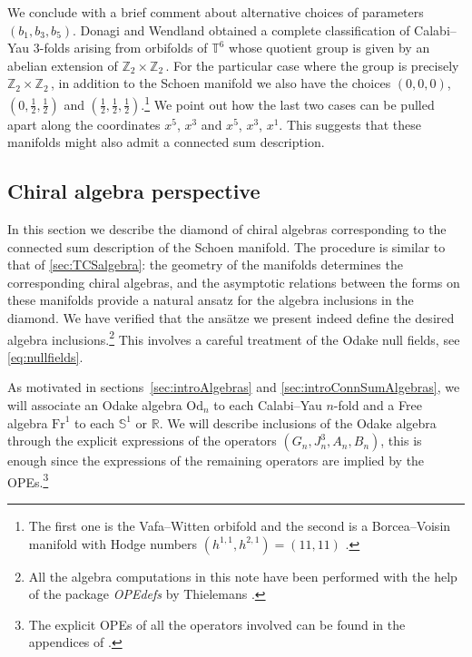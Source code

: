 \documentclass{pspum-l}
\newcommand*\Sc{\mathbb{S}}
\newcommand*\R{\mathbb{R}}
\theoremstyle{definition}
\theoremstyle{remark}
\numberwithin{equation}{section}
\begin{document}
We conclude with a brief comment about alternative choices of parameters $(b_1,b_3,b_5)$. Donagi and Wendland \cite{Donagi:2008xy} obtained a complete classification of Calabi--Yau 3-folds arising from orbifolds of $\mathbb{T}^6$ whose quotient group is given by an abelian extension of $\mathbb{Z}_2\times\mathbb{Z}_2\,$. For the particular case where the group is precisely $\mathbb{Z}_2\times\mathbb{Z}_2\,$, in addition to the Schoen manifold we also have the choices $(0,0,0)$, $(0,\frac{1}{2},\frac{1}{2})$ and $(\frac{1}{2},\frac{1}{2},\frac{1}{2})$.\footnote{The first one is the Vafa--Witten orbifold \cite{Vafa:1994rv} and the second is a Borcea--Voisin manifold \cite{Borcea:1996mxz, Voisin:246106} with Hodge numbers $\left( h^{1,1}, h^{2,1} \right)=(11,11)$ \cite{Ferrara:1995yx}.} We point out how the last two cases can be pulled apart along the coordinates $x^5$, $x^3$ and $x^5$, $x^3$, $x^1$. This suggests that these manifolds might also admit a connected sum description.



\subsection{Chiral algebra perspective}

\label{sec:Schoendiamond}

In this section we describe the diamond of chiral algebras corresponding to the connected sum description of the Schoen manifold. The procedure is similar to that of \cref{sec:TCSalgebra}: the geometry of the manifolds determines the corresponding chiral algebras, and the asymptotic relations between the forms on these manifolds provide a natural ansatz for the algebra inclusions in the diamond. We have verified that the ans\"atze we present indeed define the desired algebra inclusions.\footnote{All the algebra computations in this note have been performed with the help of the package \emph{OPEdefs} by Thielemans \cite{Thielemans:1994er}.} This involves a careful treatment of the Odake null fields, see \eqref{eq:nullfields}.

As motivated in sections~\ref{sec:introAlgebras} and \ref{sec:introConnSumAlgebras}, we will associate an Odake algebra $\text{Od}_n$ to each Calabi--Yau $n$-fold and a Free algebra $\text{Fr}^1$ to each $\Sc^1$ or $\R$. We will describe inclusions of the Odake algebra through the explicit expressions of the operators $(G_n,J^3_n,A_n,B_n)$, this is enough since the expressions of the remaining operators are implied by the OPEs.\footnote{The explicit OPEs of all the operators involved can be found in the appendices of \cite{Galdeano:2022mki}.}
\end{document}

